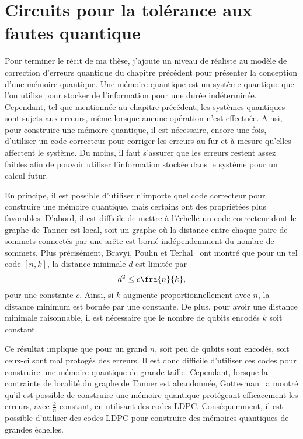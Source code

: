 \begin{comment}
\end{comment}

\chapter{Circuits pour la tolérance aux fautes quantique}

Pour terminer le récit de ma thèse,
j'ajoute un niveau de réaliste au modèle de correction d'erreurs quantique
du chapitre précédent pour présenter la conception d'une mémoire quantique.
Une mémoire quantique est un système quantique que l'on utilise pour stocker
de l'information pour une durée indéterminée.
Cependant,
tel que mentionnée au chapitre précédent,
les systèmes quantiques sont sujets aux erreurs,
même lorsque aucune opération n'est effectuée.
Ainsi,
pour construire une mémoire quantique,
il est nécessaire, encore une fois,
d'utiliser un code correcteur pour corriger les erreurs au fur et à mesure
qu'elles affectent le système.
Du moins,
il faut s'assurer que les erreurs restent assez faibles afin de pouvoir utiliser
l'information stockée dans le système pour un calcul futur.

En principe,
il est possible d'utiliser n'importe quel code correcteur pour construire
une mémoire quantique,
mais certains ont des propriétées plus favorables.
D'abord,
il est difficile de mettre à l'échelle un code correcteur dont le graphe
de Tanner est local, soit un graphe où la distance entre chaque paire de sommets 
connectés par une arête est borné indépendemment du nombre de sommets.
Plus précisément,
Bravyi, Poulin et Terhal~\cite{bravyi_tradeoffs_2010}
ont montré que pour un tel code $[n, k]$,
la distance minimale $d$ est limitée par
\begin{equation}
	d^2 \leq c \fra{n}{k},
\end{equation}
pour une constante $c$.
Ainsi,
si $k$ augmente proportionnellement avec $n$,
la distance minimum est bornée par une constante.
De plus,
pour avoir une distance minimale raisonnable,
il est nécessaire que le nombre de qubits encodés $k$ 
soit constant.

Ce résultat implique que pour un grand $n$,
soit peu de qubits sont encodés,
soit ceux-ci sont mal protogés des erreurs.
Il est donc difficile d'utiliser ces codes pour construire une mémoire 
quantique de grande taille.
Cependant,
lorsque la contrainte de localité du graphe de Tanner est abandonnée,
Gottesman~\cite{gottesman_fault-tolerant_2013} a montré qu'il est possible 
de construire une mémoire quantique protégeant efficacement les erreurs,
avec $\frac{k}{n}$ constant, en utilisant des codes LDPC.
Conséquemment,
il est possible d'utiliser des codes LDPC pour construire 
des mémoires quantiques de grandes échelles.

